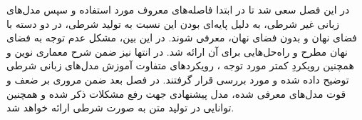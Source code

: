 در این فصل سعی شد تا در ابتدا فاصله‌های معروف مورد استفاده و سپس مدل‌های زبانی غیر شرطی، به دلیل پایه‌ای بودن این \task{} نسبت به \task{} تولید شرطی، در دو دسته با فضای نهان و بدون فضای نهان، معرفی شوند. در این بین، مشکل عدم توجه به فضای نهان مطرح و راه‌حل‌هایی برای آن ارائه شد. در انتها نیز ضمن شرح معماری نوین \transformer{} و همچنین رویکردِ کمتر مورد توجه \normalizingflownets{}، رویکرد‌های متفاوت آموزش مدل‌های زبانی شرطی توضیح داده شده و مورد بررسی قرار گرفتند.
در فصل بعد ضمن مروری بر ضعف و قوت مدل‌های معرفی شده، مدل پیشنهادی جهت رفع مشکلات ذکر شده و همچنین توانایی در تولید متن به صورت شرطی ارائه خواهد شد.
